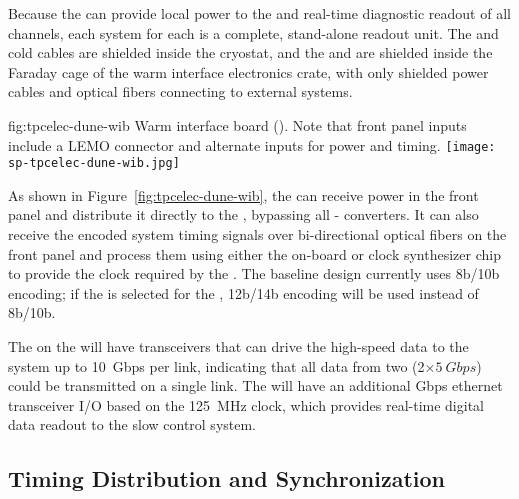 Because the  can provide local power to the  
and real-time diagnostic readout of all channels, each  
system for each  is a complete, stand-alone readout unit. 
The  and cold cables are shielded inside the cryostat, 
and the  and  are shielded inside the Faraday 
cage of the warm interface electronics crate, with only shielded power 
cables and optical fibers connecting to external systems.

\begin{dunefigure}
{fig:tpcelec-dune-wib}
{Warm interface board (). Note that front panel inputs include 
a LEMO connector and alternate inputs for  power and timing.}
\texttt{[image: sp-tpcelec-dune-wib.jpg]}
\end{dunefigure}

As shown in Figure~\ref{fig:tpcelec-dune-wib}, the  can 
receive  power in the front panel and distribute it directly 
to the , bypassing all - converters.
It can also receive the encoded system timing signals over bi-directional 
optical fibers on the front panel and process them using either
the on-board  or clock synthesizer chip to provide the 
clock required by the . The baseline  design 
currently uses 8b/10b encoding; if the   
 is selected for the  , 
12b/14b encoding will be used instead of 8b/10b.

The  on the  will have transceivers that can 
drive the high-speed data to the  system up to
\SI{10}{Gbps} per link, indicating that all data from
two  (2$\times\SI{5}{Gbps}$) could be transmitted 
on a single link. The  will have an additional 
Gbps ethernet transceiver I/O based on the \SI{125}{MHz} clock, which 
provides real-time digital data readout to the slow control system.

\subsection{Timing Distribution and Synchronization}
\label{sec:fdsp-tpcelec-design-timing}

